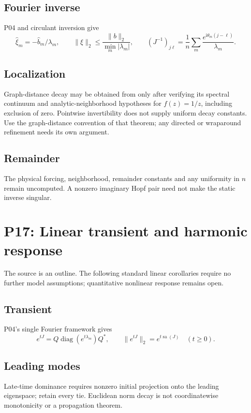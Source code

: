 \documentclass[11pt]{article}
\newcommand{\ii}{\mathrm{i}}
\DeclareMathOperator{\sa}{sa}
\DeclareMathOperator{\diag}{diag}
\theoremstyle{definition}
\theoremstyle{remark}
\begin{document}
\subsection{Fourier inverse}\label{slot:P16-2}
P04 and circulant inversion \cite[Theorem~3.1]{Gray2006} give
\[
 \widehat\xi_m=-\widehat b_m/\lambda_m,\qquad
 \|\xi\|_2\le\frac{\|b\|_2}{\min_m|\lambda_m|},\qquad
 (J^{-1})_{j\ell}=\frac1n\sum_m\frac{e^{\ii\theta_m(j-\ell)}}{\lambda_m}.
\]
\subsection{Localization}\label{slot:P16-3}
Graph-distance decay may be obtained from
\cite[Theorem~3.4]{BenziRazouk2007} only after verifying its spectral
continuum and analytic-neighborhood hypotheses for $f(z)=1/z$,
including exclusion of zero. Pointwise invertibility does not supply
uniform decay constants. Use the graph-distance convention of that theorem;
any directed or wraparound refinement needs its own argument.
\subsection{Remainder}\label{slot:P16-4}
The physical forcing, neighborhood, remainder constants and any uniformity
in $n$ remain uncomputed. A nonzero imaginary Hopf pair need not make
the static inverse singular.


\section{P17: Linear transient and harmonic response}
\label{sec:P17}
The source is an outline. The following standard linear corollaries require
no further model assumptions; quantitative nonlinear response remains open.
\subsection{Transient}\label{slot:P17-1}
P04's single Fourier framework \cite[Theorem~3.1]{Gray2006} gives
\[
 e^{tJ}=Q\diag(e^{t\lambda_m})Q^*,\qquad
 \|e^{tJ}\|_2=e^{t\sa(J)}\quad(t\ge0).
\]
\subsection{Leading modes}\label{slot:P17-2}
Late-time dominance requires nonzero initial projection onto the leading
eigenspace; retain every tie. Euclidean norm decay is not coordinatewise
monotonicity or a propagation theorem.
\end{document}
